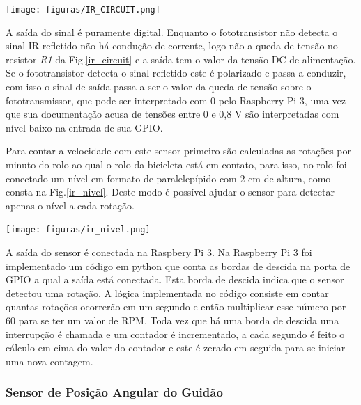             \begin{center}
    	\texttt{[image: figuras/IR\_CIRCUIT.png]}
        \label{ir_circuit}
    \end{center}

	A saída do sinal é puramente digital. Enquanto o fototransistor não detecta o sinal IR refletido não há condução de corrente, logo não a queda de tensão no resistor \textit{R1} da Fig.\ref{ir_circuit} e a saída tem o valor da tensão DC de alimentação. Se o fototransistor detecta o sinal refletido este é polarizado e passa a conduzir, com isso o sinal de saída passa a ser o valor da queda de tensão sobre o fototransmissor, que pode ser interpretado com 0 pelo Raspberry Pi 3, uma vez que sua documentação acusa de tensões entre 0 e 0,8 V são interpretadas com nível baixo na entrada de sua GPIO.

    	Para contar a velocidade com este sensor primeiro são calculadas as rotações por minuto do rolo ao qual o rolo da bicicleta está em contato, para isso, no rolo foi conectado um nível em formato de paralelepípido com 2 cm de altura, como consta na Fig.\ref{ir_nivel}. Deste modo é possível ajudar o sensor para detectar apenas o nível a cada rotação.

           \begin{center}
    	\texttt{[image: figuras/ir\_nivel.png]}
        \label{ir_nivel}
    \end{center}

    	A saída do sensor é conectada na Raspbery Pi 3. Na Raspberry  Pi 3 foi implementado um código em python que conta as bordas de descida na porta de GPIO a qual a saída está conectada. Esta borda de descida indica que o sensor detectou uma rotação. A lógica implementada no código consiste em contar quantas rotações ocorrerão em um segundo e então multiplicar esse número por 60 para se ter um valor de RPM. Toda vez que há uma borda de descida uma interrupção é chamada e um contador é incrementado, a cada segundo é feito o cálculo em cima do valor do contador e este é zerado em seguida para se iniciar uma nova contagem.

 \subsubsection{Sensor de Posição Angular do Guidão}

